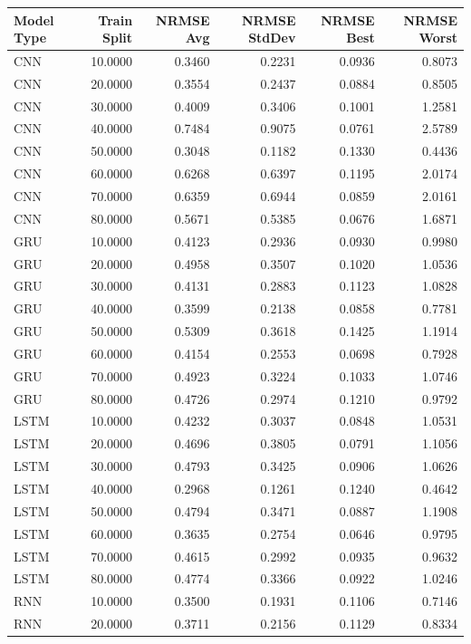 \begin{tabular}{lrrrrr}
\toprule
Model Type & Train Split & NRMSE Avg & NRMSE StdDev & NRMSE Best & NRMSE Worst \\
\midrule
CNN & 10.0000 & 0.3460 & 0.2231 & 0.0936 & 0.8073 \\
CNN & 20.0000 & 0.3554 & 0.2437 & 0.0884 & 0.8505 \\
CNN & 30.0000 & 0.4009 & 0.3406 & 0.1001 & 1.2581 \\
CNN & 40.0000 & 0.7484 & 0.9075 & 0.0761 & 2.5789 \\
CNN & 50.0000 & 0.3048 & 0.1182 & 0.1330 & 0.4436 \\
CNN & 60.0000 & 0.6268 & 0.6397 & 0.1195 & 2.0174 \\
CNN & 70.0000 & 0.6359 & 0.6944 & 0.0859 & 2.0161 \\
CNN & 80.0000 & 0.5671 & 0.5385 & 0.0676 & 1.6871 \\
GRU & 10.0000 & 0.4123 & 0.2936 & 0.0930 & 0.9980 \\
GRU & 20.0000 & 0.4958 & 0.3507 & 0.1020 & 1.0536 \\
GRU & 30.0000 & 0.4131 & 0.2883 & 0.1123 & 1.0828 \\
GRU & 40.0000 & 0.3599 & 0.2138 & 0.0858 & 0.7781 \\
GRU & 50.0000 & 0.5309 & 0.3618 & 0.1425 & 1.1914 \\
GRU & 60.0000 & 0.4154 & 0.2553 & 0.0698 & 0.7928 \\
GRU & 70.0000 & 0.4923 & 0.3224 & 0.1033 & 1.0746 \\
GRU & 80.0000 & 0.4726 & 0.2974 & 0.1210 & 0.9792 \\
LSTM & 10.0000 & 0.4232 & 0.3037 & 0.0848 & 1.0531 \\
LSTM & 20.0000 & 0.4696 & 0.3805 & 0.0791 & 1.1056 \\
LSTM & 30.0000 & 0.4793 & 0.3425 & 0.0906 & 1.0626 \\
LSTM & 40.0000 & 0.2968 & 0.1261 & 0.1240 & 0.4642 \\
LSTM & 50.0000 & 0.4794 & 0.3471 & 0.0887 & 1.1908 \\
LSTM & 60.0000 & 0.3635 & 0.2754 & 0.0646 & 0.9795 \\
LSTM & 70.0000 & 0.4615 & 0.2992 & 0.0935 & 0.9632 \\
LSTM & 80.0000 & 0.4774 & 0.3366 & 0.0922 & 1.0246 \\
RNN & 10.0000 & 0.3500 & 0.1931 & 0.1106 & 0.7146 \\
RNN & 20.0000 & 0.3711 & 0.2156 & 0.1129 & 0.8334 \\

\end{tabular}
